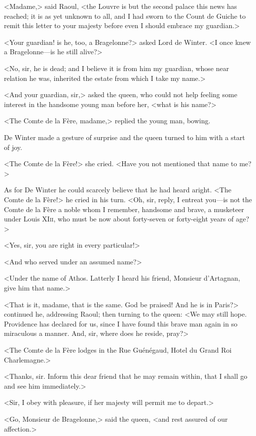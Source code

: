 <Madame,> said Raoul, <the Louvre is but the second palace this news has reached; it is as yet unknown to all, and I had sworn to the Count de Guiche to remit this letter to your majesty before even I should embrace my guardian.>

<Your guardian! is he, too, a Bragelonne?> asked Lord de Winter. <I once knew a Bragelonne—is he still alive?>

<No, sir, he is dead; and I believe it is from him my guardian, whose near relation he was, inherited the estate from which I take my name.>

<And your guardian, sir,> asked the queen, who could not help feeling some interest in the handsome young man before her, <what is his name?>

<The Comte de la Fère, madame,> replied the young man, bowing.

De Winter made a gesture of surprise and the queen turned to him with a start of joy.

<The Comte de la Fère!> she cried. <Have you not mentioned that name to me?>

As for De Winter he could scarcely believe that he had heard aright. <The Comte de la Fère!> he cried in his turn. <Oh, sir, reply, I entreat you—is not the Comte de la Fère a noble whom I remember, handsome and brave, a musketeer under Louis XI\textsc{ii}, who must be now about forty-seven or forty-eight years of age?>

<Yes, sir, you are right in every particular!>

<And who served under an assumed name?>

<Under the name of Athos. Latterly I heard his friend, Monsieur d'Artagnan, give him that name.>

<That is it, madame, that is the same. God be praised! And he is in Paris?> continued he, addressing Raoul; then turning to the queen: <We may still hope. Providence has declared for us, since I have found this brave man again in so miraculous a manner. And, sir, where does he reside, pray?>

<The Comte de la Fère lodges in the Rue Guénégaud, Hotel du Grand Roi Charlemagne.>

<Thanks, sir. Inform this dear friend that he may remain within, that I shall go and see him immediately.>

<Sir, I obey with pleasure, if her majesty will permit me to depart.>

<Go, Monsieur de Bragelonne,> said the queen, <and rest assured of our affection.>

